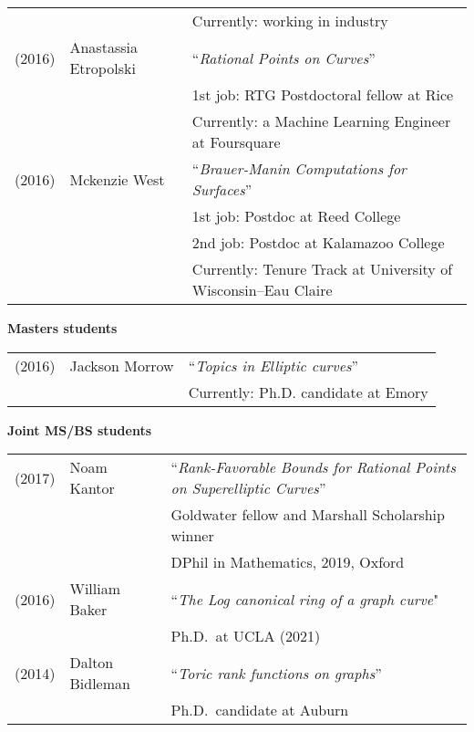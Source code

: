\documentclass[margin,line]{res}
\newcommand{\defi}[1]{\textsf{#1}} 				%
\begin{document}
\begin{resume}
\begin{tabular}{lll}
         && \hspace{4 pt} Currently: working in industry
    \vspace{4pt}\\
  (2016) & \defi{Anastassia Etropolski} &   ``\emph{Rational Points on Curves}'' \\
         && \hspace{4 pt} 1st job: RTG Postdoctoral fellow at Rice \\
         && \hspace{4 pt} Currently: a Machine Learning Engineer at Foursquare
    \vspace{4pt}\\
  (2016) & \defi{Mckenzie West} &   ``\emph{Brauer-Manin Computations for Surfaces}'' \\
         && \hspace{4 pt} 1st job: Postdoc at Reed College\\
         &&  \hspace{4 pt} 2nd job: Postdoc at Kalamazoo College \\
         && \hspace{4 pt} Currently: Tenure Track at University of Wisconsin--Eau Claire



\end{tabular}

{\bf Masters students}

\vspace*{-.15in}

\begin{tabular}{lll}
  (2016) &  Jackson Morrow & ``\emph{Topics in Elliptic curves}'' \\
  & & Currently: Ph.D.  candidate at Emory
\end{tabular}

  
{\bf Joint MS/BS students}
\vspace*{-.15in}

\begin{tabular}{lll}
  (2017) & \defi{Noam Kantor} & ``\emph{Rank-Favorable Bounds for Rational Points on Superelliptic Curves}'' \\
         &&   Goldwater fellow and Marshall Scholarship winner \\
  &&  DPhil in Mathematics, 2019,  Oxford \\
  (2016) & \defi{William Baker} & ``\emph{The Log canonical ring of a graph curve}" \\
&&    Ph.D.~at UCLA (2021)\\
  (2014) & \defi{Dalton Bidleman} & ``\emph{Toric rank functions on graphs}'' \\
  && Ph.D.~candidate at Auburn\\


\end{tabular}
\end{resume}
\end{document}
